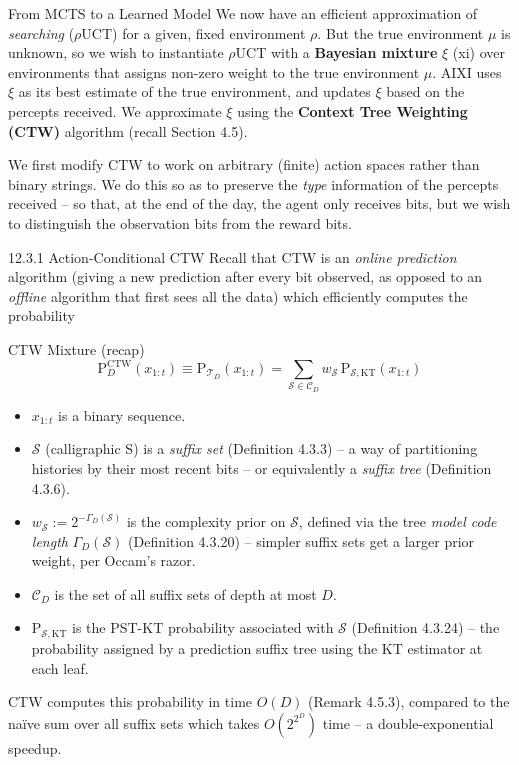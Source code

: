 \documentclass[aspectratio=169,10pt]{beamer}
\newcommand{\Scal}{\mathcal{S}}
\newcommand{\CD}{\mathcal{C}_D}
\begin{document}
\begin{frame}{From MCTS to a Learned Model}
We now have an efficient approximation of \emph{searching} ($\rho$UCT) for a given,
fixed environment $\rho$. But the true environment $\mu$ is unknown, so we wish to
instantiate $\rho$UCT with a \textbf{Bayesian mixture} $\xi$ (xi) over environments that
assigns non-zero weight to the true environment $\mu$. AIXI uses $\xi$ as its best
estimate of the true environment, and updates $\xi$ based on the percepts received. We
approximate $\xi$ using the \textbf{Context Tree Weighting (CTW)} algorithm (recall
Section 4.5).

We first modify CTW to work on arbitrary (finite) action spaces rather than binary
strings. We do this so as to preserve the \emph{type} information of the percepts
received -- so that, at the end of the day, the agent only receives bits, but we wish to
distinguish the observation bits from the reward bits.
\end{frame}

\begin{frame}{12.3.1 Action-Conditional CTW}
Recall that CTW is an \emph{online prediction} algorithm (giving a new prediction after
every bit observed, as opposed to an \emph{offline} algorithm that first sees all the
data) which efficiently computes the probability
\begin{block}{CTW Mixture (recap)}
$$\mathrm{P}_D^{\mathrm{CTW}}(x_{1:t}) \equiv \mathrm{P}_{\mathcal T_D}(x_{1:t}) =
\sum_{\Scal\in\CD} w_\Scal\, \mathrm{P}_{\Scal,\mathrm{KT}}(x_{1:t})$$
\end{block}
\begin{itemize}
\item $x_{1:t}$ is a binary sequence.
\item $\Scal$ (calligraphic S) is a \emph{suffix set} (Definition 4.3.3) -- a way of
partitioning histories by their most recent bits -- or equivalently a \emph{suffix tree}
(Definition 4.3.6).
\item $w_\Scal:=2^{-\Gamma_D(\Scal)}$ is the complexity prior on $\Scal$, defined via the
tree \emph{model code length} $\Gamma_D(\Scal)$ (Definition 4.3.20) -- simpler suffix
sets get a larger prior weight, per Occam's razor.
\item $\CD$ is the set of all suffix sets of depth at most $D$.
\item $\mathrm{P}_{\Scal,\mathrm{KT}}$ is the PST-KT probability associated with $\Scal$
(Definition 4.3.24) -- the probability assigned by a prediction suffix tree using the KT
estimator at each leaf.
\end{itemize}
CTW computes this probability in time $O(D)$ (Remark 4.5.3), compared to the na\"ive sum
over all suffix sets which takes $O(2^{2^D})$ time -- a double-exponential speedup.
\end{frame}
\end{document}

